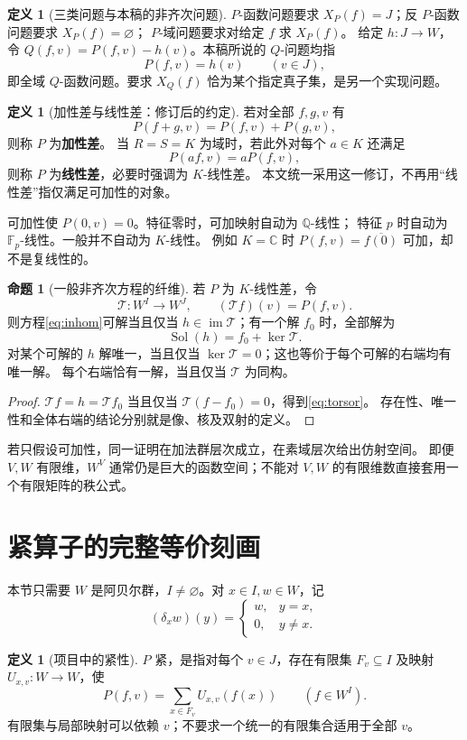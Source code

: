 \documentclass[UTF8,11pt,a4paper]{ctexart}
\theoremstyle{definition}
\newtheorem{proposition}[theorem]{命题}
\newtheorem{definition}[theorem]{定义}
\newcommand{\Q}{\mathbb Q}
\newcommand{\C}{\mathbb C}
\newcommand{\im}{\operatorname{im}}
\newcommand{\T}{\mathcal T}
\newcommand{\Sol}{\operatorname{Sol}}
\numberwithin{equation}{section}
\begin{document}
\begin{definition}[三类问题与本稿的非齐次问题]
$P$-函数问题要求 $X_P(f)=J$；反 $P$-函数问题要求 $X_P(f)=\varnothing$；
$P$-域问题要求对给定 $f$ 求 $X_P(f)$。
给定 $h:J\to W$，令 $Q(f,v)=P(f,v)-h(v)$。本稿所说的 $Q$-问题均指
\begin{equation}\label{eq:inhom}
 P(f,v)=h(v)\qquad(v\in J),
\end{equation}
即全域 $Q$-函数问题。要求 $X_Q(f)$ 恰为某个指定真子集，是另一个实现问题。
\end{definition}

\begin{definition}[加性差与线性差：修订后的约定]
若对全部 $f,g,v$ 有
\[
 P(f+g,v)=P(f,v)+P(g,v),
\]
则称 $P$ 为\textbf{加性差}。
当 $R=S=K$ 为域时，若此外对每个 $a\in K$ 还满足
\[
 P(af,v)=aP(f,v),
\]
则称 $P$ 为\textbf{线性差}，必要时强调为 $K$-线性差。
本文统一采用这一修订，不再用“线性差”指仅满足可加性的对象。
\end{definition}
可加性使 $P(0,v)=0$。特征零时，可加映射自动为 $\Q$-线性；
特征 $p$ 时自动为 $\mathbb F_p$-线性。一般并不自动为 $K$-线性。
例如 $K=\C$ 时 $P(f,v)=\overline{f(0)}$ 可加，却不是复线性的。

\begin{proposition}[一般非齐次方程的纤维]
若 $P$ 为 $K$-线性差，令
\[
 \T:W^I\to W^J,\qquad (\T f)(v)=P(f,v).
\]
则方程\eqref{eq:inhom}可解当且仅当 $h\in\im\T$；有一个解 $f_0$ 时，全部解为
\begin{equation}\label{eq:torsor}
 \Sol(h)=f_0+\ker\T.
\end{equation}
对某个可解的 $h$ 解唯一，当且仅当 $\ker\T=0$；这也等价于每个可解的右端均有唯一解。
每个右端恰有一解，当且仅当 $\T$ 为同构。
\end{proposition}
\begin{proof}
$\T f=h=\T f_0$ 当且仅当 $\T(f-f_0)=0$，得到\eqref{eq:torsor}。
存在性、唯一性和全体右端的结论分别就是像、核及双射的定义。
\end{proof}
若只假设可加性，同一证明在加法群层次成立，在素域层次给出仿射空间。
即便 $V,W$ 有限维，$W^V$ 通常仍是巨大的函数空间；不能对 $V,W$ 的有限维数直接套用一个有限矩阵的秩公式。

\section{紧算子的完整等价刻画}\label{sec:compact}
本节只需要 $W$ 是阿贝尔群，$I\ne\varnothing$。对 $x\in I,w\in W$，记
\[
 (\delta_xw)(y)=\begin{cases}w,&y=x,\\0,&y\ne x.\end{cases}
\]
\begin{definition}[项目中的紧性]
$P$ 紧，是指对每个 $v\in J$，存在有限集 $F_v\subseteq I$ 及映射 $U_{x,v}:W\to W$，使
\begin{equation}\label{eq:compact}
 P(f,v)=\sum_{x\in F_v}U_{x,v}(f(x))\qquad(f\in W^I).
\end{equation}
有限集与局部映射可以依赖 $v$；不要求一个统一的有限集合适用于全部 $v$。
\end{definition}
\end{document}
